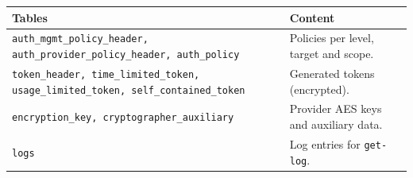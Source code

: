 \documentclass[a4paper]{arrowhead}
\begin{document}
\noindent\begin{longtable}{| p{6.4cm} | p{8.8cm} |} \hline
\rowcolor{gray!33} Tables & Content \\ \hline \endhead
\texttt{auth\_\allowbreak{}mgmt\_\allowbreak{}policy\_\allowbreak{}header,\allowbreak{} auth\_\allowbreak{}provider\_\allowbreak{}policy\_\allowbreak{}header,\allowbreak{} auth\_\allowbreak{}policy} & Policies per level, target and scope. \\ \hline
\texttt{token\_\allowbreak{}header,\allowbreak{} time\_\allowbreak{}limited\_\allowbreak{}token,\allowbreak{} usage\_\allowbreak{}limited\_\allowbreak{}token,\allowbreak{} self\_\allowbreak{}contained\_\allowbreak{}token} & Generated tokens (encrypted). \\ \hline
\texttt{encryption\_\allowbreak{}key,\allowbreak{} cryptographer\_\allowbreak{}auxiliary} & Provider AES keys and auxiliary data. \\ \hline
\texttt{logs} & Log entries for \texttt{get-\allowbreak{}log}. \\ \hline
\end{longtable}
\end{document}
